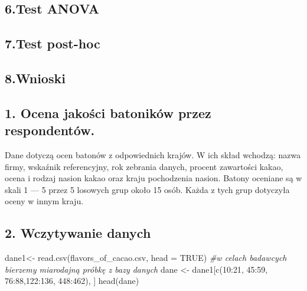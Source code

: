 \documentclass[
]{article}
\newenvironment{Shaded}{\begin{snugshade}}{\end{snugshade}}
\newcommand{\AttributeTok}[1]{\textcolor[rgb]{0.77,0.63,0.00}{#1}}
\newcommand{\CommentTok}[1]{\textcolor[rgb]{0.56,0.35,0.01}{\textit{#1}}}
\newcommand{\ConstantTok}[1]{\textcolor[rgb]{0.00,0.00,0.00}{#1}}
\newcommand{\DecValTok}[1]{\textcolor[rgb]{0.00,0.00,0.81}{#1}}
\newcommand{\FunctionTok}[1]{\textcolor[rgb]{0.00,0.00,0.00}{#1}}
\newcommand{\NormalTok}[1]{#1}
\newcommand{\OtherTok}[1]{\textcolor[rgb]{0.56,0.35,0.01}{#1}}
\newcommand{\SpecialCharTok}[1]{\textcolor[rgb]{0.00,0.00,0.00}{#1}}
\newcommand{\StringTok}[1]{\textcolor[rgb]{0.31,0.60,0.02}{#1}}
\begin{document}
\hypertarget{test-anova}{%
\subsection{6.Test ANOVA}\label{test-anova}}

\hypertarget{test-post-hoc}{%
\subsection{7.Test post-hoc}\label{test-post-hoc}}

\hypertarget{wnioski}{%
\subsection{8.Wnioski}\label{wnioski}}

\hypertarget{ocena-jakoux15bci-batonikuxf3w-przez-respondentuxf3w.-1}{%
\subsection{1. Ocena jakości batoników przez
respondentów.}\label{ocena-jakoux15bci-batonikuxf3w-przez-respondentuxf3w.-1}}

Dane dotyczą ocen batonów z odpowiednich krajów. W ich skład wchodzą:
nazwa firmy, wskaźnik referencyjny, rok zebrania danych, procent
zawartości kakao, ocena i rodzaj nasion kakao oraz kraju pochodzenia
nasion. Batony oceniane są w skali 1 --- 5 przez 5 losowych grup około
15 osób. Każda z tych grup dotyczyła oceny w innym kraju.

\hypertarget{wczytywanie-danych-1}{%
\subsection{2. Wczytywanie danych}\label{wczytywanie-danych-1}}

\begin{Shaded}
\begin{Highlighting}[]
\NormalTok{dane1}\OtherTok{\textless{}{-}} \FunctionTok{read.csv}\NormalTok{(}\StringTok{\textquotesingle{}flavors\_of\_cacao.csv\textquotesingle{}}\NormalTok{, }\AttributeTok{head =} \ConstantTok{TRUE}\NormalTok{)}
\CommentTok{\#w celach badawcych bierzemy miarodajną próbkę z bazy danych}
\NormalTok{dane }\OtherTok{\textless{}{-}}\NormalTok{ dane1[}\FunctionTok{c}\NormalTok{(}\DecValTok{10}\SpecialCharTok{:}\DecValTok{21}\NormalTok{, }\DecValTok{45}\SpecialCharTok{:}\DecValTok{59}\NormalTok{, }\DecValTok{76}\SpecialCharTok{:}\DecValTok{88}\NormalTok{,}\DecValTok{122}\SpecialCharTok{:}\DecValTok{136}\NormalTok{, }\DecValTok{448}\SpecialCharTok{:}\DecValTok{462}\NormalTok{), ]}
\FunctionTok{head}\NormalTok{(dane)}
\end{Highlighting}
\end{Shaded}
\end{document}
